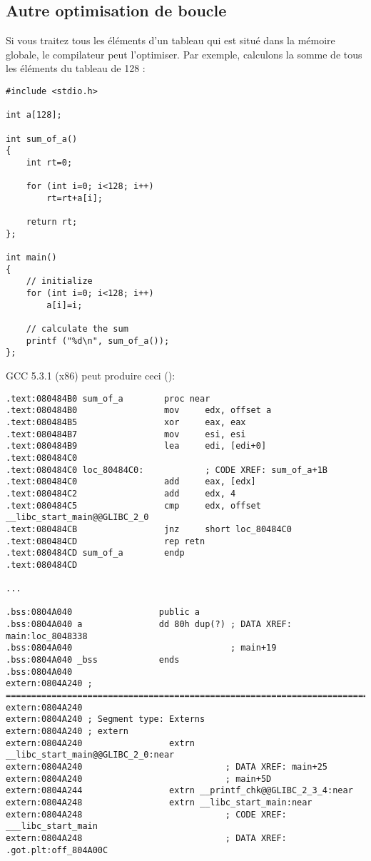 \subsection{Autre optimisation de boucle}

Si vous traitez tous les éléments d'un tableau qui est situé dans la mémoire globale,
le compilateur peut l'optimiser.
Par exemple, calculons la somme de tous les éléments du tableau de 128 :

\begin{lstlisting}[style=customc]
#include <stdio.h>

int a[128];

int sum_of_a()
{
	int rt=0;
	
	for (int i=0; i<128; i++)
		rt=rt+a[i];

	return rt;
};

int main()
{
	// initialize
	for (int i=0; i<128; i++)
		a[i]=i;
	
	// calculate the sum
	printf ("%d\n", sum_of_a());
};
\end{lstlisting}

GCC 5.3.1 (x86) \Optimizing peut produire ceci (\IDA):

\begin{lstlisting}[style=customasmx86]
.text:080484B0 sum_of_a        proc near
.text:080484B0                 mov     edx, offset a
.text:080484B5                 xor     eax, eax
.text:080484B7                 mov     esi, esi
.text:080484B9                 lea     edi, [edi+0]
.text:080484C0
.text:080484C0 loc_80484C0:            ; CODE XREF: sum_of_a+1B
.text:080484C0                 add     eax, [edx]
.text:080484C2                 add     edx, 4
.text:080484C5                 cmp     edx, offset __libc_start_main@@GLIBC_2_0
.text:080484CB                 jnz     short loc_80484C0
.text:080484CD                 rep retn
.text:080484CD sum_of_a        endp
.text:080484CD

...

.bss:0804A040                 public a
.bss:0804A040 a               dd 80h dup(?) ; DATA XREF: main:loc_8048338
.bss:0804A040                               ; main+19
.bss:0804A040 _bss            ends
.bss:0804A040
extern:0804A240 ; ===========================================================================
extern:0804A240
extern:0804A240 ; Segment type: Externs
extern:0804A240 ; extern
extern:0804A240                 extrn __libc_start_main@@GLIBC_2_0:near
extern:0804A240                            ; DATA XREF: main+25
extern:0804A240                            ; main+5D
extern:0804A244                 extrn __printf_chk@@GLIBC_2_3_4:near
extern:0804A248                 extrn __libc_start_main:near
extern:0804A248                            ; CODE XREF: ___libc_start_main
extern:0804A248                            ; DATA XREF: .got.plt:off_804A00C
\end{lstlisting}

